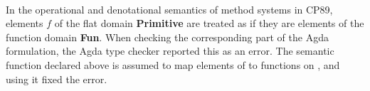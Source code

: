 \begin{AgdaAlign}
\begin{code}
\AgdaSpace{}%
\AgdaSymbol{:}\AgdaSpace{}%
\AgdaSymbol{;}\AgdaSpace{}%
\AgdaSpace{}%
\AgdaSymbol{:}\AgdaSpace{}%
\AgdaSymbol{;}\AgdaSpace{}%
\AgdaSpace{}%
\AgdaSymbol{:}\AgdaSpace{}%
\AgdaSpace{}%
\AgdaSpace{}%
\<%
\\
\>[0]\AgdaSpace{}%
\AgdaSpace{}%
\AgdaSymbol{:}\AgdaSpace{}%
\AgdaSpace{}%
\AgdaSpace{}%
\AgdaSymbol{;}\AgdaSpace{}%
\AgdaSpace{}%
\AgdaSpace{}%
\AgdaSymbol{:}\AgdaSpace{}%
\AgdaSpace{}%
\AgdaSpace{}%
\AgdaSymbol{;}\AgdaSpace{}%
\AgdaSpace{}%
\AgdaSymbol{:}\AgdaSpace{}%
\AgdaSpace{}%
\AgdaSpace{}%
\<%
\end{code}
%
In the operational and denotational semantics of method systems in CP89,
elements $f$ of the flat domain \textbf{Primitive} are treated
as if they are elements of the function domain \textbf{Fun}.
When checking the corresponding part of the Agda formulation,
the Agda type checker reported this as an error.
The semantic function  declared above is assumed to map
elements of  to functions on ,
and using it fixed the error.


\end{AgdaAlign}
